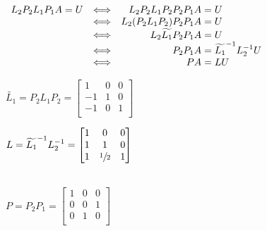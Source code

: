 \documentclass[12pt]{article}
\begin{document}
{
$
    \begin{array}{rrr@{}l}
        L_2 P_2 L_1P_1A = U
         & \Longleftrightarrow & L_2 P_2 L_1P_2P_2P_1A      & {}= U                               \\
         & \Longleftrightarrow & L_2 (P_2 L_1P_2)P_2P_1A    & {}= U                               \\
         & \Longleftrightarrow & L_2 \widetilde{L_1}P_2P_1A & {}= U                               \\
         & \Longleftrightarrow & P_2P_1A                    & {}= \widetilde{L_1}^{-1} L_2^{-1} U \\
         & \Longleftrightarrow & PA                         & {}= L U                             \\
    \end{array}
$
}\\

\begin{minipage}[t]{0.5\textwidth}
    $
        \widetilde{L_1} = P_2 L_1P_2 =
        \begin{bmatrix}
            1  & 0 & 0 \\
            -1 & 1 & 0 \\
            -1 & 0 & 1 \\
        \end{bmatrix}
    $
\end{minipage}
\begin{minipage}[t]{0.5\textwidth}
    $
        L = \widetilde{L_1}^{-1} L_2^{-1} =
        \begin{bmatrix}
            1 & 0            & 0 \\
            1 & 1            & 0 \\
            1 & \sfrac{1}{2} & 1 \\
        \end{bmatrix}
    $
\end{minipage}\\





$
    P = P_2P_1 =
    \begin{bmatrix}
        1 & 0 & 0 \\
        0 & 0 & 1 \\
        0 & 1 & 0 \\
    \end{bmatrix}
$\\
\end{document}
